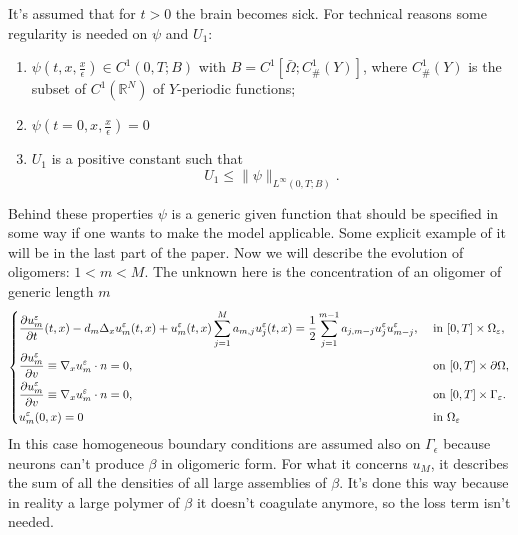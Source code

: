 It's assumed that for $t>0$ the brain becomes sick. For technical reasons some regularity is needed on $\psi$ and $U_1$:
\begin{enumerate}
    \item $\psi\left(t, x, \frac{x}{\epsilon}\right) \in C^{1}(0, T ; B)$ with $B=C^{1}\left[\bar{\Omega} ; C_{\text {\# }}^{1}(Y)\right]$, where $C_{\#}^{1}(Y)$ is the subset of $C^{1}\left(\mathbb{R}^{N}\right)$ of $Y$-periodic functions;
    \item $\psi\left(t=0, x, \frac{x}{\epsilon}\right)=0$
    \item 
$U_{1}$ is a positive constant such that
\begin{equation}
  U_{1} \leq\|\psi\|_{L^{\infty}(0, T ; B)} .
\label{eq:U_1_norm}\end{equation}
\end{enumerate}
Behind these properties $\psi $ is a generic given function that should be specified in some way if one wants to make the model applicable. Some explicit example of it will be in the last part of the paper.
Now we will describe the evolution of oligomers: $1<m<M$. The unknown here is the concentration of an oligomer of generic length $m$
\begin{equation}
    \begin{dcases}
        \frac{\partial u_{m}^{\epsilon}}{\partial t}(t, x)-d_{m} \Delta_{x} u_{m}^{\epsilon}(t, x)+u_{m}^{\epsilon}(t, x) \sum_{j=1}^{M} a_{m, j} u_{j}^{\epsilon}(t, x)= \frac{1}{2} \sum_{j=1}^{m-1} a_{j, m-j} u_{j}^{\epsilon} u_{m-j}^{\epsilon}, & \text { in }[0, T] \times \Omega_{\epsilon},\\
        \frac{\partial u_{m}^{\epsilon}}{\partial v} \equiv \nabla_{x} u_{m}^{\epsilon} \cdot n=0,  & \text { on }[0, T]\times\partial\Omega, \\
        \frac{\partial u_{m}^{\epsilon}}{\partial v} \equiv \nabla_{x} u_{m}^{\epsilon} \cdot n=0, & \text { on }[0, T]\times\Gamma_{\epsilon}.\\ 
     u_{m}^{\epsilon}(0, x)=0 & \text{ in } \Omega_{\epsilon}
    \end{dcases}
\label{eq:u_m_eqs}\end{equation}
In this case homogeneous boundary conditions are assumed also on $\Gamma_{\epsilon}$ because neurons can't produce \(\beta\) in oligomeric form.
For what it concerns $u_{M}$, it describes the sum of all the densities of all large assemblies of \(\beta\). It's done this way because in reality a large polymer of \(\beta\) it doesn't coagulate anymore, so the loss term isn't needed.
